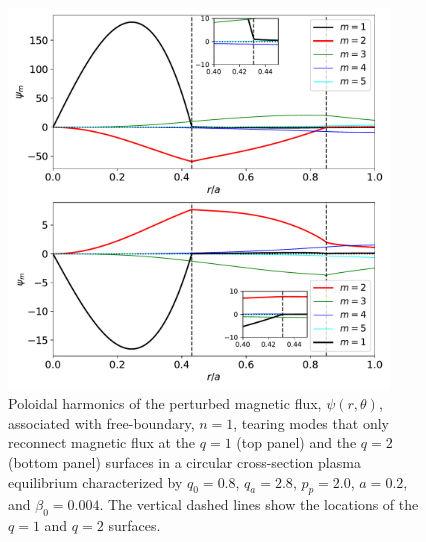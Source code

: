 \documentclass[12pt,prb,aps]{revtex4-1}
\begin{document}
\begin{figure}
\centerline{\includegraphics[width=0.9\textwidth]{Fig17.pdf}}
\caption{Poloidal harmonics of the perturbed magnetic flux, $\psi(r,\theta)$,  associated with free-boundary, $n=1$, tearing modes that only reconnect magnetic flux at the $q=1$  (top panel) and the $q=2$ (bottom panel)  surfaces in a 
circular cross-section plasma equilibrium characterized by $q_0=0.8$, $q_a= 2.8$, $p_p=2.0$,
$a=0.2$, and $\beta_0 =0.004$. The vertical dashed lines show the locations of the $q=1$ and $q=2$ surfaces. \label{fig17}}
\end{figure}
\end{document}
